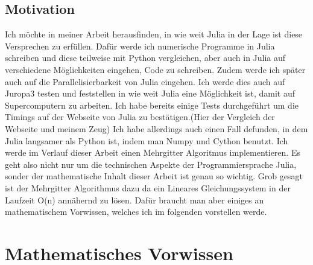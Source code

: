 \documentclass[a4paper, 11pt]{article}
\begin{document}
         \subsection{Motivation}
         Ich m\"{o}chte in meiner Arbeit herausfinden, in wie weit Julia in der Lage ist diese Versprechen zu erf\"{u}llen. Daf\"{u}r werde ich numerische Programme in Julia schreiben und diese teilweise mit Python vergleichen, aber auch in Julia auf verschiedene M\"{o}glichkeiten eingehen, Code zu schreiben. Zudem werde ich sp\"{a}ter auch auf die Parallelisierbarkeit von Julia eingehen. Ich werde dies auch auf Juropa3 testen und feststellen in wie weit Julia eine M\"{o}glichkeit ist, damit auf Supercomputern zu arbeiten.
         \newline Ich habe bereits einige Tests durchgef\"{u}hrt um die Timings auf der Webseite von Julia zu best\"{a}tigen.(Hier der Vergleich der Webseite und meinem Zeug) Ich habe allerdings auch einen Fall defunden, in dem Julia langsamer als Python ist, indem man Numpy und Cython benutzt.
         \newline Ich werde im Verlauf dieser Arbeit einen Mehrgitter Algoritmus implementieren. Es geht also nicht nur um die technischen Aspekte der Programmiersprache Julia, sonder der mathematische Inhalt dieser Arbeit ist genau so wichtig. Grob gesagt ist der Mehrgitter Algorithmus dazu da ein Lineares Gleichungssystem in der Laufzeit O(n) ann\"{a}hernd zu l\"{o}sen. Daf\"{u}r braucht man aber einiges an mathematischem Vorwissen, welches ich im folgenden vorstellen werde.
    
    \section{Mathematisches Vorwissen}
    		
\end{document}
